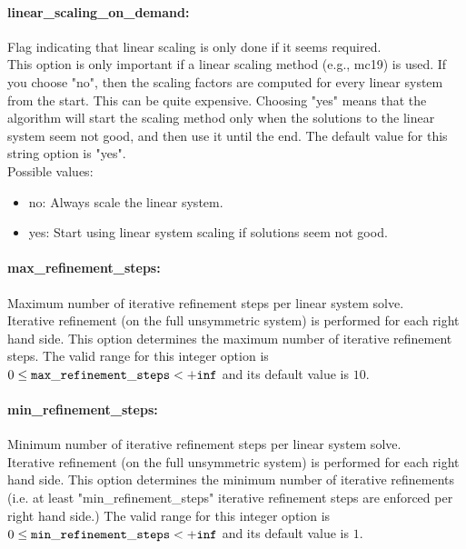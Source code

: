 \paragraph{linear\_scaling\_on\_demand:}\label{opt:linear_scaling_on_demand} Flag indicating that linear scaling is only done if it seems required. \\
 This option is only important if a linear scaling method (e.g., mc19) is used.  If you choose "no", then the scaling factors are computed for every linear system from the start.  This can be quite expensive. Choosing "yes" means that the algorithm will start the scaling method only when the solutions to the linear system seem not good, and then use it until the end. The default value for this string option is "yes".
\\ 
Possible values:
\begin{itemize}
   \item no: Always scale the linear system.
   \item yes: Start using linear system scaling if solutions seem not good.
\end{itemize}

\paragraph{max\_refinement\_steps:}\label{opt:max_refinement_steps} Maximum number of iterative refinement steps per linear system solve. \\
 Iterative refinement (on the full unsymmetric system) is performed for each right hand side.  This option determines the maximum number of iterative refinement steps. The valid range for this integer option is
$0 \le {\tt max\_refinement\_steps } <  {\tt +inf}$
and its default value is $10$.


\paragraph{min\_refinement\_steps:}\label{opt:min_refinement_steps} Minimum number of iterative refinement steps per linear system solve. \\
 Iterative refinement (on the full unsymmetric system) is performed for each right hand side.  This option determines the minimum number of iterative refinements (i.e. at least "min\_refinement\_steps" iterative refinement steps are enforced per right hand side.) The valid range for this integer option is
$0 \le {\tt min\_refinement\_steps } <  {\tt +inf}$
and its default value is $1$.


